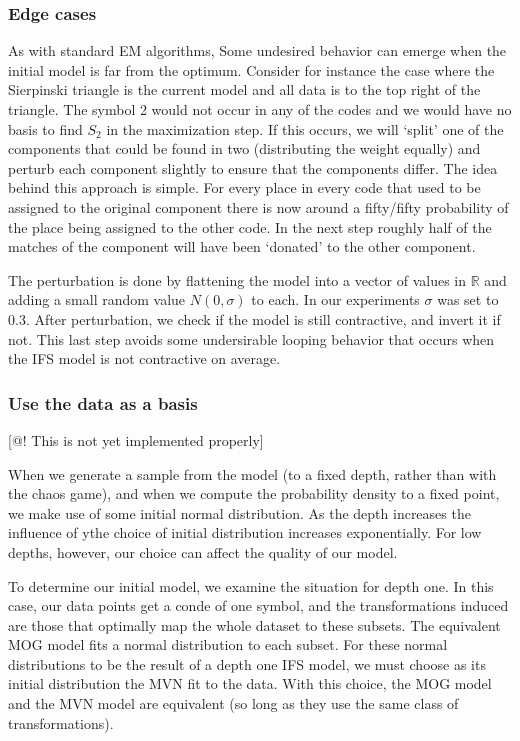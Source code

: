 \documentclass[10pt,a4paper,oneside]{article}
\theoremstyle{definition}
\begin{document}
\subsubsection*{Edge cases}

As with standard EM algorithms, Some undesired behavior can emerge when the initial model is far from the optimum. Consider for instance the case where the Sierpinski triangle is the current model and all data is to the top right of the triangle. The symbol 2 would not occur in any of the codes and we would have no basis to find $S_2$ in the maximization step. If this occurs, we will `split' one of the components that could be found in two (distributing the weight equally) and perturb each component slightly to ensure that the components differ. The idea behind this approach is simple. For every place in every code that used to be assigned to the original component there is now around a fifty/fifty probability of the place being assigned to the other code. In the next step roughly half of the matches of the component will have been `donated' to the other component.

The perturbation is done by flattening the model into a vector of values in ${\mathbb R}$ and adding a small random value $N(0, \sigma)$ to each. In our experiments $\sigma$ was set to 0.3. After perturbation, we check if the model is still contractive, and invert it if not. This last step avoids some undersirable looping behavior that occurs when the IFS model is not contractive on average.

\subsubsection*{Use the data as a basis}

[@! This is not yet implemented properly]

When we generate a sample from the model (to a fixed depth, rather than with the chaos game), and when we compute the probability density to a fixed point, we make use of some initial normal distribution. As the depth increases the influence of ythe choice of initial distribution increases exponentially. For low depths, however, our choice can affect the quality of our model. 

To determine our initial model, we examine the situation for depth one. In this case, our data points get a conde of one symbol, and the transformations induced are those that optimally map the whole dataset to these subsets. The equivalent MOG model fits a normal distribution to each subset. For these normal distributions to be the result of a depth one IFS model, we must choose as its initial distribution the MVN fit to the data. With this choice, the MOG model and the MVN model are equivalent (so long as they use the same class of transformations).
\end{document}
